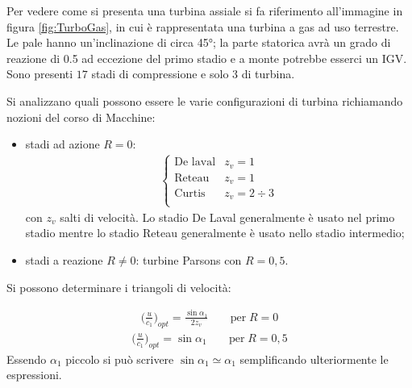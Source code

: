 Per vedere come si presenta una turbina assiale si fa riferimento all'immagine in figura \ref{fig:TurboGas}, in cui è rappresentata una turbina a gas ad uso terrestre. Le pale hanno un'inclinazione di circa \ang{45}; la parte statorica avrà un grado di reazione di 0.5 ad eccezione del primo stadio e a monte potrebbe esserci un IGV. Sono presenti $17$ stadi di compressione e solo $3$ di turbina. 

Si analizzano quali possono essere le varie configurazioni di turbina richiamando nozioni del corso di Macchine:
\begin{itemize}
	\item stadi ad azione $R = 0$:
	\begin{align*}
	\begin{cases}
	\mbox{De laval} & z_v = 1\\
	\mbox{Reteau} & z_v = 1\\
	\mbox{Curtis} & z_v = 2 \div 3\\
	\end{cases}
	\end{align*}
	con $z_v$ salti di velocità. Lo stadio De Laval generalmente è usato nel primo stadio mentre lo stadio Reteau generalmente è usato nello stadio intermedio;
	\item stadi a reazione $R\neq 0$: turbine Parsons con $R = 0,5$.
\end{itemize}
Si possono determinare i triangoli di velocità:

\begin{align*}
\bigg( \frac{u}{c_1} \bigg)_{opt} = \frac{\sin \alpha_1}{2 z_v} \;\;\;\;\;\;\; \mbox{per} \; R = 0
\end{align*}
\begin{align*}
\bigg( \frac{u}{c_1} \bigg)_{opt} = \sin \alpha_1 \;\;\;\;\;\;\; \mbox{per} \; R = 0,5
\end{align*}
Essendo $\alpha_1$ piccolo si può scrivere $ \sin \alpha_1 \simeq \alpha_1$ semplificando ulteriormente le espressioni.

